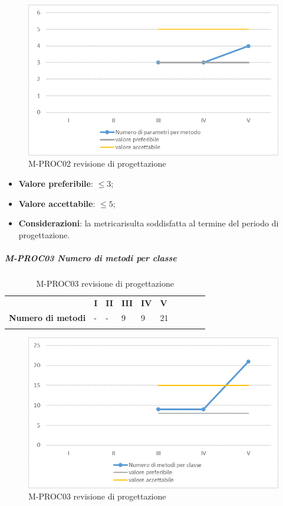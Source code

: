 \begin{figure}[H] 	
\includegraphics[width=\linewidth]{./img/grafici/RP2.png}	
\caption{M-PROC02 revisione di progettazione\glo}	
\end{figure}
\begin{itemize}
	\item \textbf{Valore preferibile}: $\le3$;
	\item \textbf{Valore accettabile}: $\le5$;
	\item \textbf{Considerazioni}: la metrica\glosp risulta soddisfatta al termine del periodo di progettazione\glo.
\end{itemize}
\pagebreak
\subparagraph{M-PROC03 Numero di metodi per classe} \mbox{}
\begin{longtable}[H!] {						
		>{}p{50mm}  		
		>{}p{8mm}
		>{}p{8mm}		
		>{}p{8mm}		
		>{}p{8mm}		
		>{}p{8mm}		
		>{}p{8mm}
		>{}p{8mm}
		>{}p{8mm}
		>{}p{8mm}
	}
	\rowcolor{gray!50}
	\textbf{} & \textbf{I} & \textbf{II} & \textbf{III} & \textbf{IV} & \textbf{V} \TBstrut \\ [2mm]
	\textbf{Numero di metodi} & - & - & 9 & 9 & 21 \TBstrut \\ [2mm]
	\rowcolor{white}
	\caption{M-PROC03 revisione di progettazione\glo}
\end{longtable}
\begin{figure}[H] 	
\includegraphics[width=\linewidth]{./img/grafici/RP3.png}	
\caption{M-PROC03 revisione di progettazione\glo}	
\end{figure}
